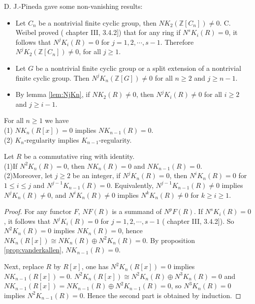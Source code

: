 D. J.-Pineda\cite{Juan2007On} gave some non-vanishing results:
\begin{itemize}
	\item Let $C_n$ be a nontrivial finite cyclic group, then $NK_2(\mathbb{Z}[C_n]) \neq 0$. C. Weibel proved (\cite{weibel2013k} chapter III, 3.4.2]) that for any ring if $N^sK_i(R)=0$, it follows that $N^jK_i(R) = 0$ for $j = 1,2,\cdots,s - 1$. Therefore $N^jK_2(\mathbb{Z}[C_n]) \neq 0$, for all $j \geq 1$.
	\item  Let $G$ be a nontrivial finite cyclic group or a split extension of a nontrivial finite cyclic group. Then $N^jK_n(\mathbb{Z}[G]) \neq 0$ for all $n \geq 2$  and $j \geq n - 1$.
	\item  By lemma \ref{lem:NjKn}, if $NK_2(R) \neq 0$, then $N^jK_i(R) \neq 0$ for all $i \geq 2$ and $j \geq i - 1$.
\end{itemize}
\begin{prop}
\label{prop:vanderkallen}
For all $n\geq 1$ we have\\
(1)  $NK_n(R[x])=0$ implies $NK_{n-1}(R)=0$.\\
(2)  $K_n$-regularity implies $K_{n-1}$-regularity.
\end{prop}
\begin{lemma}
\label{lem:NjKn}
	Let $R$ be a commutative ring with identity.\\
	(1)If $N^2K_n(R) = 0$, then $NK_n(R) = 0$ and $NK_{n-1}(R) = 0$.\\
	(2)Moreover, let $j\geq 2$ be an integer, if $N^jK_n(R) = 0$, then $N^iK_n(R) = 0$ for $1\leq i\leq j$ and $N^{j-1}K_{n-1}(R) = 0$. Equivalently, $N^{j-1}K_{n-1}(R)\neq 0$ implies $N^jK_n(R) \neq 0$, and $N^iK_n(R)\neq 0$ implies $N^kK_n(R)\neq 0$ for $k\geq i\geq 1$.
\end{lemma}
\begin{proof}
	For any functor $F$, $NF(R)$ is a summand of $N^pF(R)$.  If $N^sK_i(R)=0$, it follows that $N^jK_i(R) = 0$ for $j = 1,2,\cdots,s - 1$ (\cite{weibel2013k} chapter III, 3.4.2]). So $N^2K_n(R) = 0$ implies $NK_n(R) = 0$, hence $NK_n(R[x])\cong NK_n(R)\oplus N^2K_n(R)=0$. By proposition \ref{prop:vanderkallen}, $NK_{n-1}(R) = 0$.

	Next, replace $R$ by $R[x]$, one has $N^2K_n(R[x]) = 0$ implies $NK_{n-1}(R[x]) = 0$. $N^2K_n(R[x])\cong N^2K_n(R)\oplus N^3K_n(R)=0$ and $NK_{n-1}(R[x]) =NK_{n-1}(R)\oplus N^2K_{n-1}(R)= 0$, so $N^3K_n(R)=0$ implies $N^2K_{n-1}(R)= 0$. Hence the second part is obtained by induction.
\end{proof}

